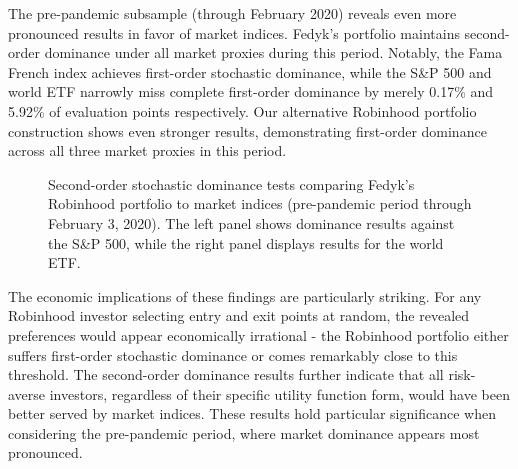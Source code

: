 The pre-pandemic subsample (through February 2020) reveals even more pronounced results in favor of market indices. 
Fedyk's portfolio maintains second-order dominance under all market proxies during this period. 
Notably, the Fama French index achieves first-order stochastic dominance, while the S\&P 500 and world ETF narrowly miss complete first-order dominance by merely 0.17\% and 5.92\% of evaluation points respectively. 
Our alternative Robinhood portfolio construction shows even stronger results, demonstrating first-order dominance across all three market proxies in this period.

\begin{figure}[h!]
    \centering
    \hfill
    \caption{Second-order stochastic dominance tests comparing Fedyk's Robinhood portfolio to market indices (pre-pandemic period through February 3, 2020). The left panel shows dominance results against the S\&P 500, while the right panel displays results for the world ETF.}
    \label{fig:cutoff_all_sidebyside}
\end{figure}

The economic implications of these findings are particularly striking. 
For any Robinhood investor selecting entry and exit points at random, the revealed preferences would appear economically irrational - the Robinhood portfolio either suffers first-order stochastic dominance or comes remarkably close to this threshold. 
The second-order dominance results further indicate that all risk-averse investors, regardless of their specific utility function form, would have been better served by market indices. 
These results hold particular significance when considering the pre-pandemic period, where market dominance appears most pronounced.

